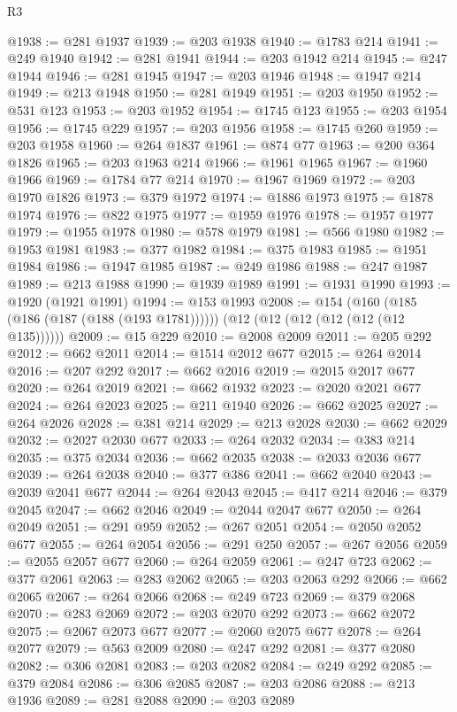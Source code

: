 \begin{lexlean}{R3}
\begin{coremodule}
@1938 := @281 @1937
@1939 := @203 @1938
@1940 := @1783 @214
@1941 := @249 @1940
@1942 := @281 @1941
@1944 := @203 @1942 @214
@1945 := @247 @1944
@1946 := @281 @1945
@1947 := @203 @1946
@1948 := @1947 @214
@1949 := @213 @1948
@1950 := @281 @1949
@1951 := @203 @1950
@1952 := @531 @123
@1953 := @203 @1952
@1954 := @1745 @123
@1955 := @203 @1954
@1956 := @1745 @229
@1957 := @203 @1956
@1958 := @1745 @260
@1959 := @203 @1958
@1960 := @264 @1837
@1961 := @874 @77
@1963 := @200 @364 @1826
@1965 := @203 @1963 @214
@1966 := @1961 @1965
@1967 := @1960 @1966
@1969 := @1784 @77 @214
@1970 := @1967 @1969
@1972 := @203 @1970 @1826
@1973 := @379 @1972
@1974 := @1886 @1973
@1975 := @1878 @1974
@1976 := @822 @1975
@1977 := @1959 @1976
@1978 := @1957 @1977
@1979 := @1955 @1978
@1980 := @578 @1979
@1981 := @566 @1980
@1982 := @1953 @1981
@1983 := @377 @1982
@1984 := @375 @1983
@1985 := @1951 @1984
@1986 := @1947 @1985
@1987 := @249 @1986
@1988 := @247 @1987
@1989 := @213 @1988
@1990 := @1939 @1989
@1991 := @1931 @1990
@1993 := @1920 (@1921 @1991)
@1994 := @153 @1993
@2008 := @154
    (@160 (@185 (@186 (@187 (@188 (@193 @1781))))))
    (@12 (@12 (@12 (@12 (@12 (@12 @135))))))
@2009 := @15 @229
@2010 := @2008 @2009
@2011 := @205 @292
@2012 := @662 @2011
@2014 := @1514 @2012 @677
@2015 := @264 @2014
@2016 := @207 @292
@2017 := @662 @2016
@2019 := @2015 @2017 @677
@2020 := @264 @2019
@2021 := @662 @1932
@2023 := @2020 @2021 @677
@2024 := @264 @2023
@2025 := @211 @1940
@2026 := @662 @2025
@2027 := @264 @2026
@2028 := @381 @214
@2029 := @213 @2028
@2030 := @662 @2029
@2032 := @2027 @2030 @677
@2033 := @264 @2032
@2034 := @383 @214
@2035 := @375 @2034
@2036 := @662 @2035
@2038 := @2033 @2036 @677
@2039 := @264 @2038
@2040 := @377 @386
@2041 := @662 @2040
@2043 := @2039 @2041 @677
@2044 := @264 @2043
@2045 := @417 @214
@2046 := @379 @2045
@2047 := @662 @2046
@2049 := @2044 @2047 @677
@2050 := @264 @2049
@2051 := @291 @959
@2052 := @267 @2051
@2054 := @2050 @2052 @677
@2055 := @264 @2054
@2056 := @291 @250
@2057 := @267 @2056
@2059 := @2055 @2057 @677
@2060 := @264 @2059
@2061 := @247 @723
@2062 := @377 @2061
@2063 := @283 @2062
@2065 := @203 @2063 @292
@2066 := @662 @2065
@2067 := @264 @2066
@2068 := @249 @723
@2069 := @379 @2068
@2070 := @283 @2069
@2072 := @203 @2070 @292
@2073 := @662 @2072
@2075 := @2067 @2073 @677
@2077 := @2060 @2075 @677
@2078 := @264 @2077
@2079 := @563 @2009
@2080 := @247 @292
@2081 := @377 @2080
@2082 := @306 @2081
@2083 := @203 @2082
@2084 := @249 @292
@2085 := @379 @2084
@2086 := @306 @2085
@2087 := @203 @2086
@2088 := @213 @1936
@2089 := @281 @2088
@2090 := @203 @2089

\end{coremodule}
\end{lexlean}
